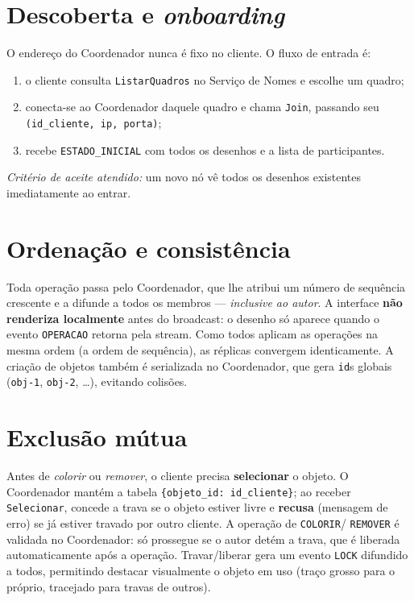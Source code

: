 \section{Descoberta e \emph{onboarding}}
\label{sec:descoberta}

O endereço do Coordenador nunca é fixo no cliente. O fluxo de entrada é:

\begin{enumerate}
  \item o cliente consulta \texttt{ListarQuadros} no Serviço de Nomes e escolhe um quadro;
  \item conecta-se ao Coordenador daquele quadro e chama \texttt{Join}, passando seu
        \texttt{(id\_cliente, ip, porta)};
  \item recebe \texttt{ESTADO\_INICIAL} com todos os desenhos e a lista de participantes.
\end{enumerate}

\emph{Critério de aceite atendido:} um novo nó vê todos os desenhos existentes
imediatamente ao entrar.

\section{Ordenação e consistência}
\label{sec:ordenacao}

Toda operação passa pelo Coordenador, que lhe atribui um número de sequência crescente e a
difunde a todos os membros --- \emph{inclusive ao autor}. A interface \textbf{não renderiza
localmente} antes do broadcast: o desenho só aparece quando o evento \texttt{OPERACAO}
retorna pela stream. Como todos aplicam as operações na mesma ordem (a ordem de sequência),
as réplicas convergem identicamente. A criação de objetos também é serializada no
Coordenador, que gera \texttt{id}s globais (\texttt{obj-1}, \texttt{obj-2}, \ldots),
evitando colisões.

\section{Exclusão mútua}
\label{sec:exclusao}

Antes de \emph{colorir} ou \emph{remover}, o cliente precisa \textbf{selecionar} o objeto.
O Coordenador mantém a tabela \texttt{\{objeto\_id: id\_cliente\}}; ao receber
\texttt{Selecionar}, concede a trava se o objeto estiver livre e \textbf{recusa} (mensagem
de erro) se já estiver travado por outro cliente. A operação de \texttt{COLORIR}/%
\texttt{REMOVER} é validada no Coordenador: só prossegue se o autor detém a trava, que é
liberada automaticamente após a operação. Travar/liberar gera um evento \texttt{LOCK}
difundido a todos, permitindo destacar visualmente o objeto em uso (traço grosso para o
próprio, tracejado para travas de outros).

